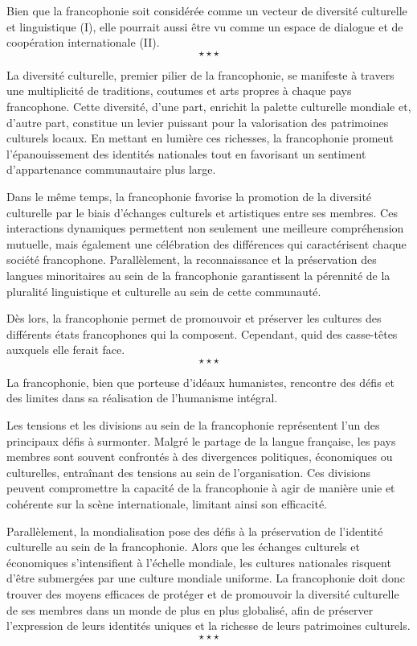 Bien que la francophonie soit considérée comme un vecteur de diversité culturelle et linguistique (I), elle pourrait aussi être vu comme un espace de dialogue et de coopération internationale (II).
$$\star \star \star$$

La diversité culturelle, premier pilier de la francophonie, se manifeste à travers une multiplicité de traditions, coutumes et arts propres à chaque pays francophone. Cette diversité, d'une part, enrichit la palette culturelle mondiale et, d'autre part, constitue un levier puissant pour la valorisation des patrimoines culturels locaux. En mettant en lumière ces richesses, la francophonie promeut l'épanouissement des identités nationales tout en favorisant un sentiment d'appartenance communautaire plus large.

Dans le même temps, la francophonie favorise la promotion de la diversité culturelle par le biais d'échanges culturels et artistiques entre ses membres. Ces interactions dynamiques permettent non seulement une meilleure compréhension mutuelle, mais également une célébration des différences qui caractérisent chaque société francophone. Parallèlement, la reconnaissance et la préservation des langues minoritaires au sein de la francophonie garantissent la pérennité de la pluralité linguistique et culturelle au sein de cette communauté.

Dès lors, la francophonie permet de promouvoir et préserver les cultures des différents états francophones qui la composent. Cependant, quid des casse-têtes auxquels elle ferait face.
$$\star \star \star$$

La francophonie, bien que porteuse d'idéaux humanistes, rencontre des défis et des limites dans sa réalisation de l'humanisme intégral.

Les tensions et les divisions au sein de la francophonie représentent l'un des principaux défis à surmonter. Malgré le partage de la langue française, les pays membres sont souvent confrontés à des divergences politiques, économiques ou culturelles, entraînant des tensions au sein de l'organisation. Ces divisions peuvent compromettre la capacité de la francophonie à agir de manière unie et cohérente sur la scène internationale, limitant ainsi son efficacité.

Parallèlement, la mondialisation pose des défis à la préservation de l'identité culturelle au sein de la francophonie. Alors que les échanges culturels et économiques s'intensifient à l'échelle mondiale, les cultures nationales risquent d'être submergées par une culture mondiale uniforme. La francophonie doit donc trouver des moyens efficaces de protéger et de promouvoir la diversité culturelle de ses membres dans un monde de plus en plus globalisé, afin de préserver l'expression de leurs identités uniques et la richesse de leurs patrimoines culturels.
$$\star \star \star$$

